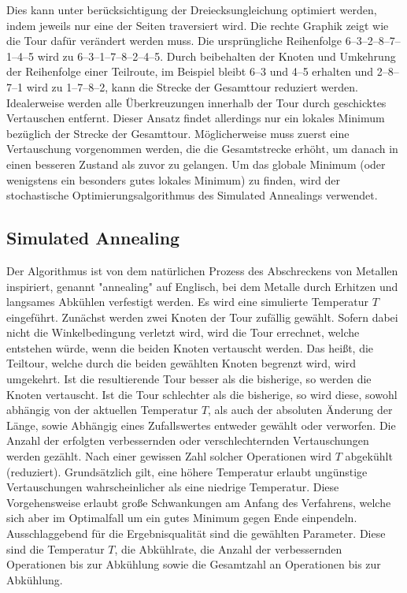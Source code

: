 Dies kann unter berücksichtigung der Dreiecksungleichung optimiert werden, indem jeweils nur eine der Seiten traversiert wird.
Die rechte Graphik zeigt wie die Tour dafür verändert werden muss.
Die ursprüngliche Reihenfolge 6--3--2--8--7--1--4--5 wird zu 6--3--1--7--8--2--4--5.
Durch beibehalten der Knoten und Umkehrung der Reihenfolge einer Teilroute,
im Beispiel bleibt 6--3 und 4--5 erhalten und 2--8--7--1 wird zu 1--7--8--2, kann die Strecke der Gesamttour reduziert werden. \\
Idealerweise werden alle Überkreuzungen innerhalb der Tour durch geschicktes Vertauschen entfernt.
Dieser Ansatz findet allerdings nur ein lokales Minimum bezüglich der Strecke der Gesamttour.
Möglicherweise muss zuerst eine Vertauschung vorgenommen werden, die die Gesamtstrecke erhöht, um
danach in einen besseren Zustand als zuvor zu gelangen.
Um das globale Minimum (oder wenigstens ein besonders gutes lokales Minimum) zu finden, wird der stochastische
Optimierungsalgorithmus des Simulated Annealings verwendet.

\subsection{Simulated Annealing}\label{subsec:simulated-annealing}
Der Algorithmus ist von dem natürlichen Prozess des Abschreckens von Metallen inspiriert, genannt "annealing" auf
Englisch, bei dem Metalle durch Erhitzen und langsames Abkühlen verfestigt werden.
Es wird eine simulierte Temperatur $T$ eingeführt.
Zunächst werden zwei Knoten der Tour zufällig gewählt.
Sofern dabei nicht die Winkelbedingung verletzt wird, wird die Tour errechnet, welche entstehen würde,
wenn die beiden Knoten vertauscht werden.
Das hei{\ss}t, die Teiltour, welche durch die beiden gewählten Knoten begrenzt wird, wird umgekehrt.
Ist die resultierende Tour besser als die bisherige, so werden die Knoten vertauscht.
Ist die Tour schlechter als die bisherige, so wird diese, sowohl abhängig von der
aktuellen Temperatur $T$, als auch der absoluten Änderung der Länge, sowie Abhängig eines
Zufallswertes entweder gewählt oder verworfen.
Die Anzahl der erfolgten verbessernden oder verschlechternden Vertauschungen werden gezählt.
Nach einer gewissen Zahl solcher Operationen wird $T$ abgekühlt (reduziert).
Grundsätzlich gilt, eine höhere Temperatur erlaubt ungünstige Vertauschungen wahrscheinlicher als eine niedrige Temperatur.
Diese Vorgehensweise erlaubt gro{\ss}e Schwankungen am Anfang des Verfahrens, welche sich aber im Optimalfall um ein gutes
Minimum gegen Ende einpendeln.
Ausschlaggebend für die Ergebnisqualität sind die gewählten Parameter.
Diese sind die Temperatur $T$, die Abkühlrate, die Anzahl der verbessernden Operationen bis zur Abkühlung sowie die Gesamtzahl
an Operationen bis zur Abkühlung.


